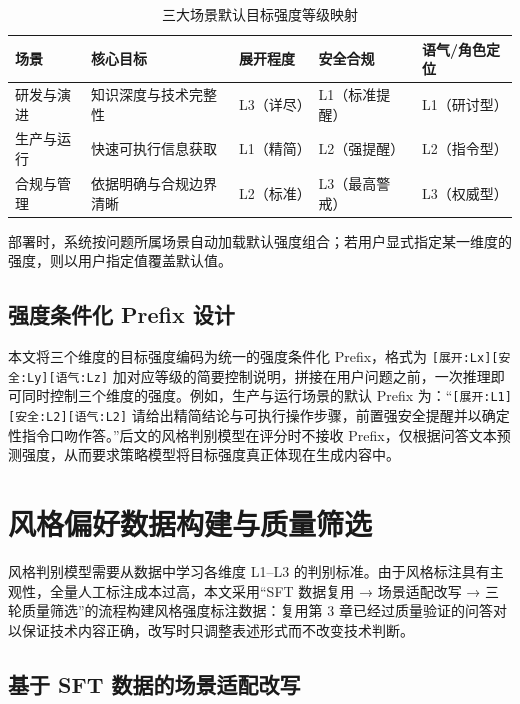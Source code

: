 \documentclass[fontset=fandol,type=master,campus=shenzhen,etitleauto=true]{hithesisbook}
\begin{document}
\begin{table}[htbp]
\centering
\caption{三大场景默认目标强度等级映射}
\label{tab:scene-intensity-map}
\small
\renewcommand{\arraystretch}{1.1}
\begin{tabular}{p{2.2cm}p{3.0cm}p{1.6cm}p{2.4cm}p{2.6cm}}
\toprule
\textbf{场景} & \textbf{核心目标} & \textbf{展开程度} & \textbf{安全合规} & \textbf{语气/角色定位} \\
\midrule
研发与演进 & 知识深度与技术完整性 & L3（详尽） & L1（标准提醒） & L1（研讨型） \\
生产与运行 & 快速可执行信息获取 & L1（精简） & L2（强提醒） & L2（指令型） \\
合规与管理 & 依据明确与合规边界清晰 & L2（标准） & L3（最高警戒） & L3（权威型） \\
\bottomrule
\end{tabular}
\end{table}

部署时，系统按问题所属场景自动加载默认强度组合；若用户显式指定某一维度的强度，则以用户指定值覆盖默认值。

\subsection{强度条件化 Prefix 设计}\label{ux5f3aux5ea6ux6761ux4ef6ux5316-prefix-ux8bbeux8ba1}

本文将三个维度的目标强度编码为统一的强度条件化 Prefix，格式为 \texttt{[展开:Lx][安全:Ly][语气:Lz]} 加对应等级的简要控制说明，拼接在用户问题之前，一次推理即可同时控制三个维度的强度。例如，生产与运行场景的默认 Prefix 为：“\texttt{[展开:L1][安全:L2][语气:L2]} 请给出精简结论与可执行操作步骤，前置强安全提醒并以确定性指令口吻作答。”后文的风格判别模型在评分时不接收 Prefix，仅根据问答文本预测强度，从而要求策略模型将目标强度真正体现在生成内容中。

\section{风格偏好数据构建与质量筛选}\label{ux98ceux683cux504fux597dux6570ux636eux6784ux5efaux4e0e-llm-as-judge-ux7b5bux9009}

风格判别模型需要从数据中学习各维度 L1--L3 的判别标准。由于风格标注具有主观性，全量人工标注成本过高，本文采用“SFT 数据复用 → 场景适配改写 → 三轮质量筛选”的流程构建风格强度标注数据：复用第 3 章已经过质量验证的问答对以保证技术内容正确，改写时只调整表述形式而不改变技术判断。

\subsection{基于 SFT 数据的场景适配改写}\label{ux57faux4e8e-sft-ux6570ux636eux7684ux573aux666fux9002ux914dux6539ux5199}
\end{document}
